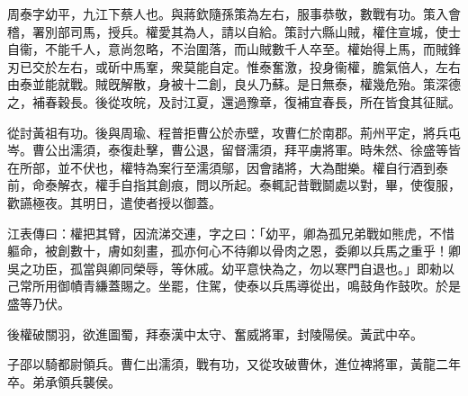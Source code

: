 
\begin{pinyinscope}
周泰字幼平，九江下蔡人也。與蔣欽隨孫策為左右，服事恭敬，數戰有功。策入會稽，署別部司馬，授兵。權愛其為人，請以自給。策討六縣山賊，權住宣城，使士自衞，不能千人，意尚忽略，不治圍落，而山賊數千人卒至。權始得上馬，而賊鋒刃已交於左右，或斫中馬鞌，衆莫能自定。惟泰奮激，投身衞權，膽氣倍人，左右由泰並能就戰。賊旣解散，身被十二創，良乆乃蘇。是日無泰，權幾危殆。策深德之，補春穀長。後從攻皖，及討江夏，還過豫章，復補宜春長，所在皆食其征賦。

從討黃祖有功。後與周瑜、程普拒曹公於赤壁，攻曹仁於南郡。荊州平定，將兵屯岑。曹公出濡須，泰復赴擊，曹公退，留督濡須，拜平虜將軍。時朱然、徐盛等皆在所部，並不伏也，權特為案行至濡須鄔，因會諸將，大為酣樂。權自行酒到泰前，命泰解衣，權手自指其創痕，問以所起。泰輒記昔戰鬬處以對，畢，使復服，歡讌極夜。其明日，遣使者授以御蓋。

江表傳曰：權把其臂，因流涕交連，字之曰：「幼平，卿為孤兄弟戰如熊虎，不惜軀命，被創數十，膚如刻畫，孤亦何心不待卿以骨肉之恩，委卿以兵馬之重乎！卿吳之功臣，孤當與卿同榮辱，等休戚。幼平意快為之，勿以寒門自退也。」即勑以己常所用御幘青縑蓋賜之。坐罷，住駕，使泰以兵馬導從出，鳴鼓角作鼓吹。於是盛等乃伏。

後權破關羽，欲進圖蜀，拜泰漢中太守、奮威將軍，封陵陽侯。黃武中卒。

子邵以騎都尉領兵。曹仁出濡須，戰有功，又從攻破曹休，進位裨將軍，黃龍二年卒。弟承領兵襲侯。


\end{pinyinscope}